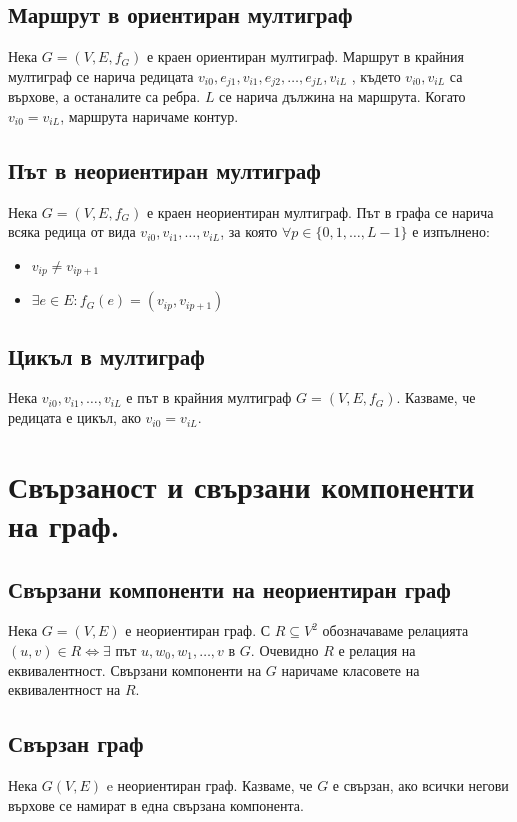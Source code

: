 \documentclass[fleqn,12pt]{article}
\begin{document}
\begin{flushleft}
\subsection{Маршрут в ориентиран мултиграф}
Нека $G = (V, E, f_G)$ е краен ориентиран мултиграф. Маршрут в крайния мултиграф се нарича
редицата $v_{i0}, e_{j1}, v_{i1}, e_{j2} , \dots , e_{jL} , v_{iL}$ , където $v_{i0}, v_{iL}$ са върхове, а останалите са ребра. 
$L$ се нарича дължина на маршрута. Когато $v_{i0} = v_{iL}$, маршрута наричаме контур.

\subsection{Път в неориентиран мултиграф}
Нека $G = (V, E, f_G)$ е краен неориентиран мултиграф. Път в графа се нарича всяка редица от вида
$v_{i0}, v_{i1}, \dots, v_{iL}$, за която $\forall p \in \{ 0, 1, \dots, L - 1 \}$ е изпълнено:
\begin{itemize}
	\item $v_{ip} \neq v_{ip+1}$
	\item $\exists e \in E : f_G(e) = (v_{ip}, v_{ip+1})$
\end{itemize}

\subsection{Цикъл в мултиграф}
Нека $v_{i0}, v_{i1}, \dots, v_{iL}$ е път в крайния мултиграф $G = (V, E, f_G)$.
Казваме, че редицата е цикъл, ако $v_{i0} = v_{iL}$.

\section{Свързаност и свързани компоненти на граф.} 

\subsection{Свързани компоненти на неориентиран граф}
Нека $G = (V, E)$ е неориентиран граф. 
С $R \subseteq V^2$ обозначаваме релацията $ (u, v) \in R \Leftrightarrow \exists $ път $u, w_0, w_1, \dots, v$ в $G$.
Очевидно $R$ е релация на еквивалентност. Свързани компоненти на $G$ наричаме класовете на еквивалентност на $R$.

\subsection{Свързан граф}
Нека $G(V, E)$ e неориентиран граф. Казваме, че $G$ е свързан, ако всички негови върхове
се намират в една свързана компонента.


\end{flushleft}
\end{document}
